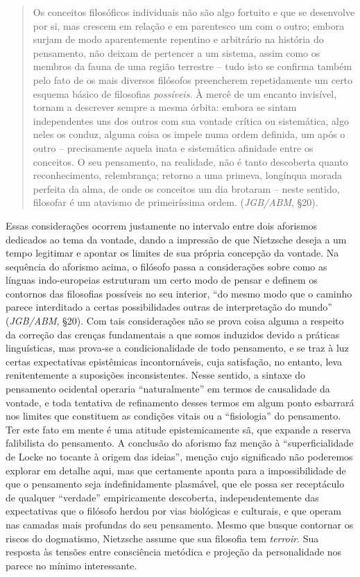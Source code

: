 \documentclass[
	12pt,				%
	openright,			%
	oneside,			%
	a4paper,			%
	english,			%
	french,				%
	spanish,			%
	brazil				%
	]{abntex2}
\begin{document}
\begin{quotation}
Os conceitos filosóficos individuais não são algo fortuito e que se desenvolve por si, mas crescem em relação e em parentesco um com o outro; embora surjam de modo aparentemente repentino e arbitrário na história do pensamento, não deixam de pertencer a um sistema, assim como os membros da fauna de uma região terrestre – tudo isto se confirma também pelo fato de os mais diversos filósofos preencherem repetidamente um certo esquema básico de filosofias \textit{possíveis}. À mercê de um encanto invisível, tornam a descrever sempre a mesma órbita: embora se sintam independentes uns dos outros com sua vontade crítica ou sistemática, algo neles os conduz, alguma coisa os impele numa ordem definida, um após o outro – precisamente aquela inata e sistemática afinidade entre os conceitos. O seu pensamento, na realidade, não é tanto descoberta quanto reconhecimento, relembrança; retorno a uma primeva, longínqua morada perfeita da alma, de onde os conceitos um dia brotaram – neste sentido, filosofar é um atavismo de primeiríssima ordem. (\textit{JGB/ABM}, §20).
\end{quotation}

Essas considerações ocorrem justamente no intervalo entre dois aforismos dedicados ao tema da vontade, dando a impressão de que Nietzsche deseja a um tempo legitimar e apontar os limites de sua própria concepção da vontade. Na sequência do aforismo acima, o filósofo passa a considerações sobre como as línguas indo-europeias estruturam um certo modo de pensar e definem os contornos das filosofias possíveis no seu interior, “do mesmo modo que o caminho parece interditado a certas possibilidades outras de interpretação do mundo” (\textit{JGB/ABM}, §20). Com tais considerações não se prova coisa alguma a respeito da correção das crenças fundamentais a que somos induzidos devido a práticas linguísticas, mas prova-se a condicionalidade de todo pensamento, e se traz à luz certas expectativas epistêmicas incontornáveis, cuja satisfação, no entanto, leva renitentemente a suposições inconsistentes. Nesse sentido, a sintaxe do pensamento ocidental operaria “naturalmente” em termos de causalidade da vontade, e toda tentativa de refinamento desses termos em algum ponto esbarrará nos limites que constituem as condições vitais ou a “fisiologia” do pensamento. Ter este fato em mente é uma atitude epistemicamente sã, que expande a reserva falibilista do pensamento. A conclusão do aforismo faz menção à “superficialidade de Locke no tocante à origem das ideias”, menção cujo significado não poderemos explorar em detalhe aqui, mas que certamente aponta para a impossibilidade de que o pensamento  seja indefinidamente plasmável, que ele possa ser receptáculo de qualquer “verdade” empiricamente descoberta, independentemente das expectativas que o filósofo herdou por vias biológicas e culturais, e que operam nas camadas mais profundas do seu pensamento. Mesmo que busque contornar os riscos do dogmatismo, Nietzsche assume que sua filosofia tem \textit{terroir}. Sua resposta às tensões entre consciência metódica e projeção da personalidade nos parece no mínimo interessante.
\end{document}
